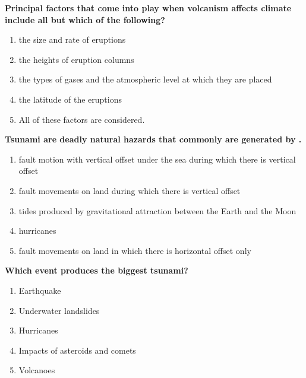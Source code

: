 \item {
\setlength{\itemsep}{0cm}
\setlength{\parskip}{.2cm}
\begin{samepage}
\textbf{
Principal factors that come into play when volcanism affects climate include all but which of the following?
}
\begin{enumerate}
\item {  the size and rate of eruptions }
\item {  the heights of eruption columns }
\item {  the types of gases and the atmospheric level at which they are placed }
\item {  the latitude of the eruptions }
\item {  All of these factors are considered. }
\end{enumerate}
\end{samepage}
}
\item {
\setlength{\itemsep}{0cm}
\setlength{\parskip}{.2cm}
\begin{samepage}
\textbf{
Tsunami are deadly natural hazards that commonly are generated by \makebox[1cm]{\Rivpt\hrulefill\Rivpt}.
}
\begin{enumerate}
\item { 	fault motion with vertical offset under the sea during which there is vertical offset }
\item { 	fault movements on land during which there is vertical offset }
\item { 	tides produced by gravitational attraction between the Earth and the Moon }
\item { 	hurricanes }
\item { 	fault movements on land in which there is horizontal offset only 		 }
\end{enumerate}
\end{samepage}
}
\item {
\setlength{\itemsep}{0cm}
\setlength{\parskip}{.2cm}
\begin{samepage}
\textbf{
Which event produces the biggest tsunami?
}
\begin{enumerate}
\item { 	Earthquake }
\item { 	Underwater landslides }
\item { 	Hurricanes }
\item { 	Impacts of asteroids and comets }
\item { 	Volcanoes 		 }
\end{enumerate}
\end{samepage}
}
